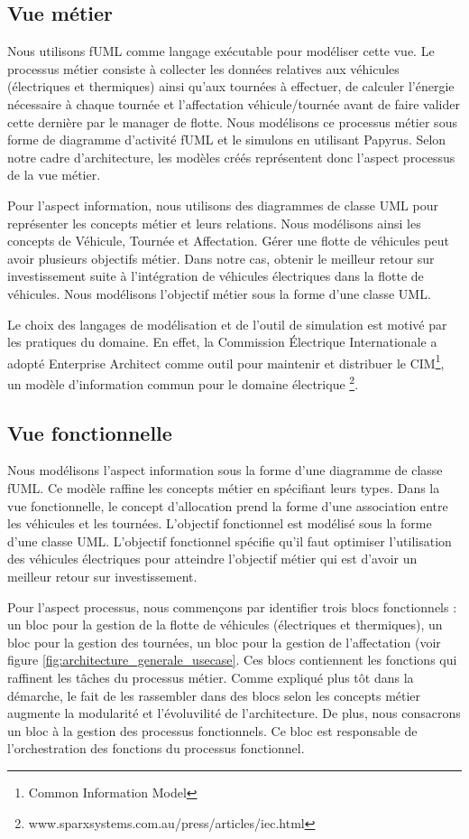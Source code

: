 \subsection{Vue métier}
Nous utilisons fUML comme langage exécutable pour modéliser cette vue. Le processus métier consiste à collecter les données relatives aux véhicules (électriques et thermiques) ainsi qu'aux tournées à effectuer, de calculer l'énergie nécessaire à chaque tournée et l'affectation véhicule/tournée avant de faire valider cette dernière par le manager de flotte. Nous modélisons ce processus métier sous forme de diagramme d'activité fUML et le simulons en utilisant Papyrus. Selon notre cadre d'architecture, les modèles créés représentent donc l'aspect processus de la vue métier.

Pour l'aspect information, nous utilisons des diagrammes de classe UML pour représenter les concepts métier et leurs relations. Nous modélisons ainsi les concepts de Véhicule, Tournée et Affectation.
Gérer une flotte de véhicules peut avoir plusieurs objectifs métier. Dans notre cas, obtenir le meilleur retour sur investissement suite à l'intégration de véhicules électriques dans la flotte de véhicules. Nous modélisons l'objectif métier sous la forme d'une classe UML.

Le choix des langages de modélisation et de l'outil de simulation est motivé par les pratiques du domaine. En effet, la Commission Électrique Internationale a adopté Enterprise Architect comme outil pour maintenir et distribuer le CIM\footnote{Common Information Model}\cite{uslar2012standardization}, un modèle d'information commun pour le domaine électrique \footnote{www.sparxsystems.com.au/press/articles/iec.html}.
	

\subsection{Vue fonctionnelle}

Nous modélisons l'aspect information sous la forme d'une diagramme de classe fUML. Ce modèle raffine les concepts métier en spécifiant leurs types. Dans la vue fonctionnelle, le concept d'allocation prend la forme d'une association entre les véhicules et les tournées. L'objectif fonctionnel est modélisé sous la forme d'une classe UML. L'objectif fonctionnel spécifie qu'il faut optimiser l'utilisation des véhicules électriques pour atteindre l'objectif métier qui est d'avoir un meilleur retour sur investissement.

Pour l'aspect processus, nous commençons par identifier trois blocs fonctionnels : un bloc pour la gestion de la flotte de véhicules (électriques et thermiques), un bloc pour la gestion des tournées, un bloc pour la gestion de l'affectation (voir figure \ref{fig:architecture_generale_usecase}. Ces blocs contiennent les fonctions qui raffinent les tâches du processus métier. Comme expliqué plus tôt dans la démarche, le fait de les rassembler dans des blocs selon les concepts métier augmente la modularité et l'évoluvilité de l'architecture. De plus, nous consacrons un bloc à la gestion des processus fonctionnels. Ce bloc est responsable de l'orchestration des fonctions du processus fonctionnel. 

